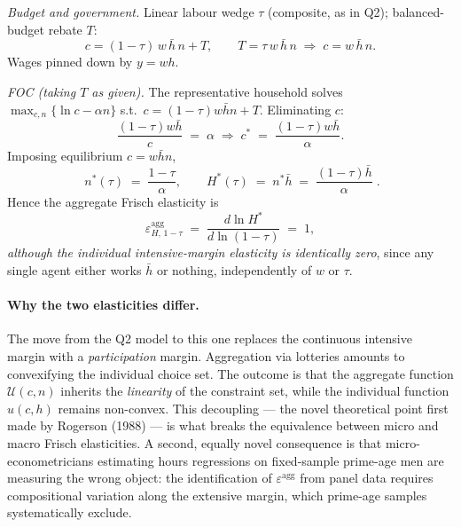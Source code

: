 \documentclass[11pt,a4paper]{article}
\begin{document}
\smallskip
\emph{Budget and government.} Linear labour wedge $\tau$ (composite, as in Q2); balanced-budget rebate $T$:
\[
c = (1-\tau)\,w\,\bar h\, n + T,\qquad T = \tau\, w\,\bar h\, n \;\Longrightarrow\; c = w\,\bar h\, n.
\]
Wages pinned down by $y=wh$.

\smallskip
\emph{FOC (taking $T$ as given).} The representative household solves $\max_{c,n}\{\ln c - \alpha n\}$ s.t.\ $c=(1-\tau)w\bar h n + T$. Eliminating $c$:
\begin{equation}
\frac{(1-\tau)w\bar h}{c}\;=\;\alpha
\;\Longrightarrow\; c^{*}\;=\;\frac{(1-\tau)w\bar h}{\alpha}.
\label{eq:foc_indiv}
\end{equation}
Imposing equilibrium $c=w\bar h n$,
\begin{equation}
\boxed{\;n^{*}(\tau)\;=\;\frac{1-\tau}{\alpha},\qquad
H^{*}(\tau)\;=\;n^{*}\bar h \;=\;\frac{(1-\tau)\bar h}{\alpha}\;.}
\label{eq:indiv_hours}
\end{equation}
Hence the aggregate Frisch elasticity is
\begin{equation}
\varepsilon^{\text{agg}}_{H,\,1-\tau}\;=\;\frac{d\ln H^{*}}{d\ln(1-\tau)}\;=\;1,
\label{eq:agg_elast}
\end{equation}
\emph{although the individual intensive-margin elasticity is identically zero}, since any single agent either works $\bar h$ or nothing, independently of $w$ or $\tau$.

\paragraph{Why the two elasticities differ.} The move from the Q2 model to this one replaces the continuous intensive margin with a \emph{participation} margin. Aggregation via lotteries amounts to convexifying the individual choice set. The outcome is that the aggregate function $\mathcal{U}(c,n)$ inherits the \emph{linearity} of the constraint set, while the individual function $u(c,h)$ remains non-convex. This decoupling --- the novel theoretical point first made by Rogerson (1988) --- is what breaks the equivalence between micro and macro Frisch elasticities. A second, equally novel consequence is that micro-econometricians estimating hours regressions on fixed-sample prime-age men are measuring the wrong object: the identification of $\varepsilon^{\text{agg}}$ from panel data requires compositional variation along the extensive margin, which prime-age samples systematically exclude.
\end{document}

